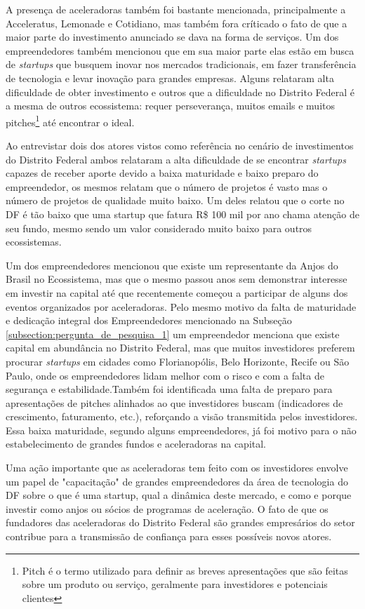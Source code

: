 A presença de aceleradoras também foi bastante mencionada, principalmente a Acceleratus, Lemonade e Cotidiano, mas também fora críticado o fato de que a maior parte do investimento anunciado se dava na forma de serviços. Um dos empreendedores também mencionou que em sua maior parte elas estão em busca de \textit{startups} que busquem inovar nos mercados tradicionais, em fazer transferência de tecnologia e levar inovação para grandes empresas. Alguns relataram alta dificuldade de obter investimento e outros que a dificuldade no Distrito Federal é a mesma de outros ecossistema: requer perseverança, muitos emails e muitos pitches\footnote{Pitch é o termo utilizado para definir as breves apresentações que são feitas sobre um produto ou serviço, geralmente para investidores e potenciais clientes} até encontrar o ideal.

Ao entrevistar dois dos atores vistos como referência no cenário de investimentos do Distrito Federal ambos relataram a alta dificuldade de se encontrar \textit{startups} capazes de receber aporte devido a baixa maturidade e baixo preparo do empreendedor, os mesmos relatam que o número de projetos é vasto mas o número de projetos de qualidade muito baixo. Um deles relatou que o corte no DF é tão baixo que uma startup que fatura R\$ 100 mil por ano chama atenção de seu fundo, mesmo sendo um valor considerado muito baixo para outros ecossistemas. 

Um dos empreendedores mencionou que existe um representante da Anjos do Brasil no Ecossistema, mas que o mesmo passou anos sem demonstrar interesse em investir na capital até que recentemente começou a participar de alguns dos eventos organizados por aceleradoras. Pelo mesmo motivo da falta de maturidade e dedicação integral dos Empreendedores mencionado na Subseção \ref{subsection:pergunta_de_pesquisa_1} um empreendedor menciona que existe capital em abundância no Distrito Federal, mas que muitos investidores preferem procurar \textit{startups} em cidades como Florianopólis, Belo Horizonte, Recife ou São Paulo, onde os empreendedores lidam melhor com o risco e com a falta de segurança e estabilidade.Também foi identificada uma falta de preparo para apresentações de pitches alinhados ao que investidores buscam (indicadores de crescimento, faturamento, etc.), reforçando a visão transmitida pelos investidores. Essa baixa maturidade, segundo alguns empreendedores, já foi motivo para o não estabelecimento de grandes fundos e aceleradoras na capital.

Uma ação importante que as aceleradoras tem feito com os investidores envolve um papel de "capacitação" de grandes empreendedores da área de tecnologia do DF sobre o que é uma startup, qual a dinâmica deste mercado, e como e porque investir como anjos ou sócios de programas de aceleração. O fato de que os fundadores das aceleradoras do Distrito Federal são grandes empresários do setor contribue para a transmissão de confiança para esses possíveis novos atores. 

